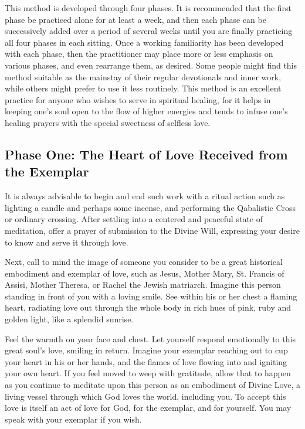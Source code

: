 \documentclass{article}
\begin{document}
This method is developed through four phases. It is recommended that the first phase be
practiced alone for at least a week, and then each phase can be successively added over a
period of several weeks until you are finally practicing all four phases in each sitting.
Once a working familiarity has been developed with each phase, then the practitioner
may place more or less emphasis on various phases, and even rearrange them, as desired.
Some people might find this method suitable as the mainstay of their regular devotionals
and inner work, while others might prefer to use it less routinely. This method is an
excellent practice for anyone who wishes to serve in spiritual healing, for it helps in
keeping one’s soul open to the flow of higher energies and tends to infuse one’s healing
prayers with the special sweetness of selfless love.

\subsection*{Phase One: The Heart of Love Received from the Exemplar}

It is always advisable to begin and end such work with a ritual action such as lighting a
candle and perhaps some incense, and performing the Qabalistic Cross or ordinary
crossing. After settling into a centered and peaceful state of meditation, offer a prayer of
submission to the Divine Will, expressing your desire to know and serve it through love.

Next, call to mind the image of someone you consider to be a great historical
embodiment and exemplar of love, such as Jesus, Mother Mary, St. Francis of Assisi,
Mother Theresa, or Rachel the Jewish matriarch. Imagine this person standing in front of
you with a loving smile. See within his or her chest a flaming heart, radiating love out
through the whole body in rich hues of pink, ruby and golden light, like a splendid
sunrise. 

Feel the warmth on your face and chest. Let yourself respond emotionally to this great
soul’s love, smiling in return. Imagine your exemplar reaching out to cup your heart in
his or her hands, and the flames of love flowing into and igniting your own heart. If you
feel moved to weep with gratitude, allow that to happen as you continue to meditate upon
this person as an embodiment of Divine Love, a living vessel through which God loves
the world, including you. To accept this love is itself an act of love for God, for the
exemplar, and for yourself. You may speak with your exemplar if you wish.
\end{document}
